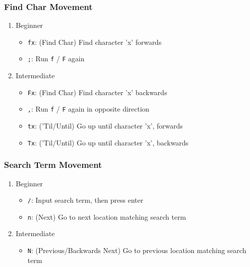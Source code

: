 \documentclass[11pt]{article}
\begin{document}
\subsubsection{Find Char Movement}
\label{sec:org3f377da}
\begin{enumerate}
\item Beginner
\label{sec:org75716e7}
\begin{itemize}
\item \texttt{fx}: (Find Char) Find character 'x' forwards
\item \texttt{;}: Run \texttt{f} / \texttt{F} again
\end{itemize}
\item Intermediate
\label{sec:orgfeb80bf}
\begin{itemize}
\item \texttt{Fx}: (Find Char) Find character 'x' backwards
\item \texttt{,}: Run \texttt{f} / \texttt{F} again in opposite direction
\item \texttt{tx}: ('Til/Until) Go up until character 'x', forwards
\item \texttt{Tx}: ('Til/Until) Go up until character 'x', backwards
\end{itemize}
\end{enumerate}
\subsubsection{Search Term Movement}
\label{sec:orgc01f5f4}
\begin{enumerate}
\item Beginner
\label{sec:orgb62a94a}
\begin{itemize}
\item \texttt{/}: Input search term, then press enter
\item \texttt{n}: (Next) Go to next location matching search term
\end{itemize}
\item Intermediate
\label{sec:org19eaa20}
\begin{itemize}
\item \texttt{N}: (Previous/Backwards Next) Go to previous location matching search term
\end{itemize}
\end{enumerate}
\end{document}
